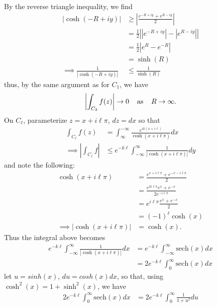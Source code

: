 \documentclass{article}
\begin{document}
\begin{itemize}
\begin{itemize}
        By the reverse triangle inequality, we find
        \begin{align*}
            |\cosh(-R + iy)| &\geq \left|\frac{e^{-R + iy} + e^{R - iy}}{2}\right|\\
            &= \frac{1}{2}\left||e^{-R + iy}| - |e^{R - iy}|\right|\\
            &= \frac{1}{2}\left|e^{R} - e^{-R}\right|\\
            &= \sinh(R)\\
            \implies \frac{1}{|\cosh(-R + iy)|} &\leq \frac{1}{\sinh(R)}
        \end{align*}
        thus, by the same argument as for $C_1$, we have
        \[\left|\int_{C_2}f(z)\right| \to 0 \hspace{0.4cm} \text{as} \hspace{0.4cm} R \to \infty.\]
        On $C_{\ell}$, parameterize $z = x + i\ell\pi$, $dz = dx$ so that
        \begin{align*}
            \int_{C_{\ell}}f(z) &= \int_{\infty}^{-\infty}\frac{e^{ik(x + i\ell)}}{\cosh(x + i\ell\pi)}dx\\
            \implies \left|\int_{C_{\ell}}f\right| &\leq e^{-k\ell}\int_{-\infty}^{\infty}\frac{1}{|\cosh(x + i\ell\pi)|}dy
        \end{align*}
        and note the following:
        \begin{align*}
            \cosh(x + i\ell\pi) &= \frac{e^{x + i\ell\pi} + e^{-x - i\ell\pi}}{2}\\
            &= \frac{e^{2i\ell\pi}e^x + e^{-x}}{2e^{-i\ell\pi}}\\
            &= e^{i\ell\pi}\frac{e^x + e^{-x}}{2}\\
            &=  (-1)^{\ell}\cosh(x)\\
            \implies |\cosh(x + i\ell\pi)| &= \cosh(x).
        \end{align*}
        Thus the integral above becomes
        \begin{align*}
            e^{-k\ell}\int_{-\infty}^{\infty}\frac{1}{|\cosh(x + i\ell \pi)|}dx &= e^{-k\ell}\int_{-\infty}^{\infty} \text{sech}(x)dx\\
            &= 2e^{-k\ell}\int_0^{\infty} \text{sech}(x)dx 
        \end{align*}
        let $u = sinh(x)$, $du = cosh(x)dx$, so that, using $\cosh^2(x) = 1 + \sinh^2(x)$, we have
        \begin{align*}
            2e^{-k\ell}\int_0^{\infty} \text{sech}(x)dx &= 2e^{-k\ell}\int_0^{\infty} \frac{1}{1 + u^2}du\\

\end{align*}
\end{itemize}
\end{itemize}
\end{document}
